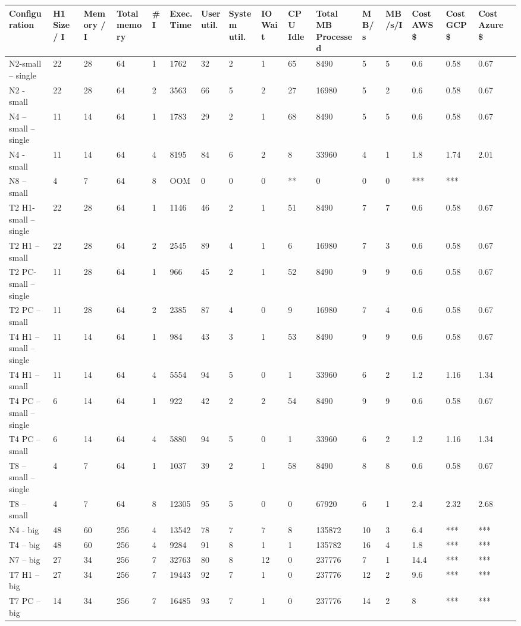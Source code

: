 		\begin{tabularx}{\linewidth}{*{17}{X}}
	    \hline
        Configuration & H1 Size / I & Memory / I & Total memory & \#I & Exec. Time & User util. & System util. & IO Wait & CPU Idle & Total MB Processed & MB/s & MB/s/I & Cost AWS \$ & Cost GCP \$ & Cost Azure \$ \\
        \hline
        N2-small – single & 22 & 28 & 64 & 1 & 1762 & 32 & 2 & 1 & 65 & 8490 & 5 & 5 & 0.6 & 0.58 & 0.67 \\
        N2 - small & 22 & 28 & 64 & 2 & 3563 & 66 & 5 & 2 & 27 & 16980 & 5 & 2 & 0.6 & 0.58 & 0.67 \\
        N4 – small – single & 11 & 14 & 64 & 1 & 1783 & 29 & 2 & 1 & 68 & 8490 & 5 & 5 & 0.6 & 0.58 & 0.67 \\
        N4 - small & 11 & 14 & 64 & 4 & 8195 & 84 & 6 & 2 & 8 & 33960 & 4 & 1 & 1.8 & 1.74 & 2.01 \\
        N8 – small & 4 & 7 & 64 & 8 & OOM & 0 & 0 & 0 & ** & 0 & 0 & 0 & *** & *** \\
        T2 H1- small – single & 22 & 28 & 64 & 1 & 1146 & 46 & 2 & 1 & 51 & 8490 & 7 & 7 & 0.6 & 0.58 & 0.67 \\
        T2 H1 – small & 22 & 28 & 64 & 2 & 2545 & 89 & 4 & 1 & 6 & 16980 & 7 & 3 & 0.6 & 0.58 & 0.67 \\
        T2 PC- small – single & 11 & 28 & 64 & 1 & 966 & 45 & 2 & 1 & 52 & 8490 & 9 & 9 & 0.6 & 0.58 & 0.67 \\
        T2 PC – small & 11 & 28 & 64 & 2 & 2385 & 87 & 4 & 0 & 9 & 16980 & 7 & 4 & 0.6 & 0.58 & 0.67 \\
        T4 H1 – small – single & 11 & 14 & 64 & 1 & 984 & 43 & 3 & 1 & 53 & 8490 & 9 & 9 & 0.6 & 0.58 & 0.67 \\
        T4 H1 – small & 11 & 14 & 64 & 4 & 5554 & 94 & 5 & 0 & 1 & 33960 & 6 & 2 & 1.2 & 1.16 & 1.34 \\
        T4 PC – small – single & 6 & 14 & 64 & 1 & 922 & 42 & 2 & 2 & 54 & 8490 & 9 & 9 & 0.6 & 0.58 & 0.67 \\
        T4 PC – small & 6 & 14 & 64 & 4 & 5880 & 94 & 5 & 0 & 1 & 33960 & 6 & 2 & 1.2 & 1.16 & 1.34 \\
        T8 – small – single & 4 & 7 & 64 & 1 & 1037 & 39 & 2 & 1 & 58 & 8490 & 8 & 8 & 0.6 & 0.58 & 0.67 \\
        T8 – small & 4 & 7 & 64 & 8 & 12305 & 95 & 5 & 0 & 0 & 67920 & 6 & 1 & 2.4 & 2.32 & 2.68 \\
        N4 - big & 48 & 60 & 256 & 4 & 13542 & 78 & 7 & 7 & 8 & 135872 & 10 & 3 & 6.4 & *** & *** \\
        T4 – big & 48 & 60 & 256 & 4 & 9284 & 91 & 8 & 1 & 1 & 135782 & 16 & 4 & 1.8 & *** & *** \\
        N7 – big & 27 & 34 & 256 & 7 & 32763 & 80 & 8 & 12 & 0 & 237776 & 7 & 1 & 14.4 & *** & *** \\
        T7 H1 – big & 27 & 34 & 256 & 7 & 19443 & 92 & 7 & 1 & 0 & 237776 & 12 & 2 & 9.6 & *** & *** \\
        T7 PC – big & 14 & 34 & 256 & 7 & 16485 & 93 & 7 & 1 & 0 & 237776 & 14 & 2 & 8 & *** & *** \\
        \hline
	\bottomrule
    \end{tabularx}
